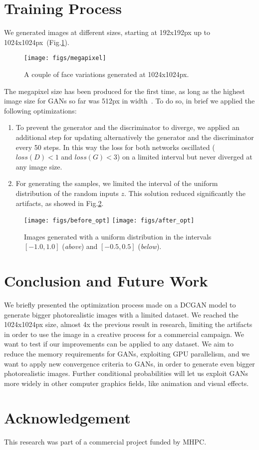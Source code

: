 \documentclass[10pt,twocolumn,letterpaper]{article}
\begin{document}
\section{Training Process}
We generated images at different sizes, starting at 192x192px up to 1024x1024px~(Fig.\ref{fig:megapixel}). 
\begin{figure}[ht]
  \centering
  \texttt{[image: figs/megapixel]}
  \caption{A couple of face variations generated at 1024x1024px.}
  \label{fig:megapixel}
\end{figure}
The megapixel size has been produced for the first time, as long as the highest image size for GANs so far was 512px in width~\cite{DBLP:journals/corr/ZhuPIE17}. 
To do so, in brief we applied the following optimizations:
\begin{enumerate}
\item{To prevent the generator and the discriminator to diverge, we applied an additional step for updating alternatively the generator and the discriminator every 50 steps. In this way the loss for both networks oscillated ($loss(D) < 1$ and $loss(G) < 3 $) on a limited interval  but never diverged at any image size.}
\item{For generating the samples, we limited the interval of the uniform distribution of the random inputs $z$. This solution reduced significantly the artifacts, as showed in Fig.\ref{fig:after_opt}.}
\end{enumerate}
\begin{figure}[ht]
 \centering
  \texttt{[image: figs/before\_opt]}
  \texttt{[image: figs/after\_opt]}
  \caption{Images generated with a uniform distribution in the intervals $[-1.0, 1.0]$ (\textit{above}) and $[-0.5, 0.5]$ (\textit{below}).}
  \label{fig:after_opt}
\end{figure}

\section{Conclusion and Future Work}
We briefly presented the optimization process made on a DCGAN model to generate bigger photorealistic images with a limited dataset. We reached the 1024x1024px size, almost 4x the previous result in research, limiting the artifacts in order to use the image in a creative process for a commercial campaign. We want to test if our improvements can be applied to any dataset. We aim to reduce the memory requirements for GANs, exploiting GPU parallelism, and we want to apply new convergence criteria to GANs, in order to generate even bigger photorealistic images. Further conditional probabili\-ties will let us exploit GANs more widely in other computer graphics fields, like animation and visual effects.

\section*{Acknowledgement}
This research was part of a commercial project funded by MHPC.


 
\end{document}
